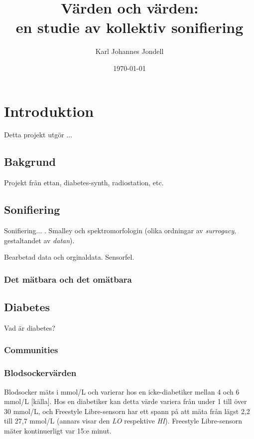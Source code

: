 \documentclass[11pt, twoside, a4paper]{article}
\title{Värden och värden:\\
	\large en studie av kollektiv sonifiering
}
\author{Karl Johannes Jondell}
\date{\today}
\begin{document}



\tableofcontents

\newpage

\section{Introduktion}
Detta projekt utgör ...

\subsection{Bakgrund}
Projekt från ettan, diabetes-synth, radiostation, etc.

\subsection{Sonifiering}
Sonifiering... \cite{bijsterveld_sonic_2019}. 
Smalley och spektromorfologin (olika ordningar av \emph{surrogacy},  gestaltandet av \emph{datan}).

Bearbetad data och orginaldata. Sensorfel.
\subsubsection{Det mätbara och det omätbara}
\cite{bornemark_det_2018}

\subsection{Diabetes}
Vad är diabetes? 

\subsubsection{Communities}

\subsubsection{Blodsockervärden}
Blodsocker mäts i mmol/L och varierar hos en icke-diabetiker mellan 4 och 6 mmol/L [källa]. Hos en diabetiker kan detta värde variera från under 1 till över 30 mmol/L, och Freestyle Libre-sensorn har ett spann på att mäta från lägst 2,2 till 27,7 mmol/L (annars visar den \emph{LO} respektive \emph{HI}). Freestyle Libre-sensorn mäter kontinuerligt var 15:e minut.
\end{document}
